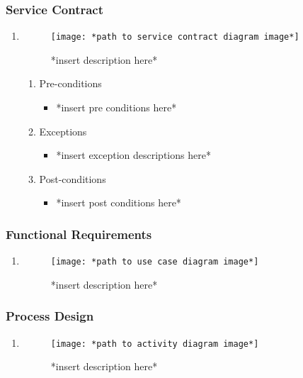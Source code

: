 \subsubsection{Service Contract}
	\begin{enumerate}
		\item
			\begin{figure}[h]
				\centering
				\texttt{[image: *path to service contract diagram image*]}
				\caption{*insert description here*}
			\end{figure}
			
			\begin{enumerate}
				\item Pre-conditions
					\begin{itemize}
						\item *insert pre conditions here* 
					\end{itemize}
				
				\item Exceptions
					\begin{itemize}
						\item *insert exception descriptions here* 
					\end{itemize}
					
				\item Post-conditions
				\begin{itemize}
					\item *insert post conditions here* 
				\end{itemize}
			\end{enumerate}
\end{enumerate}

\subsubsection{Functional Requirements}
	\begin{enumerate}
		\item
			\begin{figure}[h]
				\centering
				\texttt{[image: *path to use case diagram image*]}
				\caption{*insert description here*}
			\end{figure}	
	\end{enumerate}
	
\subsubsection{Process Design}
	\begin{enumerate}
		\item
		\begin{figure}[h]
			\centering
			\texttt{[image: *path to activity diagram image*]}
			\caption{*insert description here*}
		\end{figure}
	\end{enumerate}